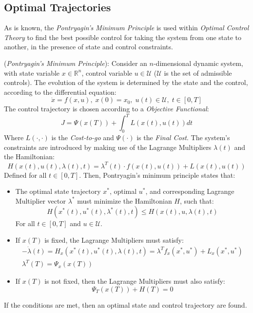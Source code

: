 \subsection{Optimal Trajectories}
As is known, the \textit{Pontryagin's Minimum Principle}  is used within \textit{Optimal Control Theory} to find the best possible control for taking the system from one state to another, in the presence of state and control constraints. 
\begin{definition}\label{Pontryagin_Min_Principle}
    (\textit{Pontryagin's Minimum Principle}): Consider an $n$-dimensional dynamic system, with state variable $x \in \mathbb{R}^{n}$, control variable $u\in\mathcal{U}$ ($\mathcal{U}$ is the set of admissible controls). The evolution of the system is determined by the state and the control, according to the differential equation:
    \begin{equation*}
        \dot{x}=f(x,u), \; x(0)=x_0, \; u(t)\in\mathcal{U}, \; t\in[0, T]
    \end{equation*}
    The control trajectory is chosen according to a \textit{Objective Functional}:
    \begin{equation*}
        J=\Psi(x(T))+\int_{0}^{T}{L(x(t),u(t))dt} 
    \end{equation*}
    Where $L(\cdot,\cdot)$ is the \textit{Cost-to-go} and $\Psi(\cdot)$ is the \textit{Final Cost}. The system's constraints are introduced by making use of the Lagrange Multipliers $\lambda(t)$ and the Hamiltonian:
    \begin{equation*}
        H(x(t),u(t),\lambda(t),t)=\lambda^{T}(t)\cdot f(x(t),u(t))+L(x(t),u(t))
    \end{equation*}                                    
    Defined for all $t\in[0,T]$. Then, Pontryagin's minimum principle states that:
    \begin{itemize}
        \item  The optimal state trajectory $x^*$, optimal $u^*$, and corresponding Lagrange Multiplier vector $\lambda^*$ must minimize the Hamiltonian $H$, such that:
        \begin{equation}\label{Hamiltonian_Minimization}
            H(x^*(t),u^*(t),\lambda^*(t),t)\leq H(x(t),u,\lambda(t),t)
        \end{equation}
        For all $t\in[0,T]$ and $u \in \mathcal{U}$. 
        \item If $x(T)$ is fixed, the Lagrange Multipliers must satisfy:
        \begin{gather}\label{fixed_state_lagrangian_mult}
            -\dot{\lambda}(t)=H_{x}(x^*(t),u^*(t),\lambda(t),t)=\lambda^{T}f_x(x^*,u^*)+L_{x}(x^*,u^*) \\
            \lambda^{T}(T)=\Psi_{x}(x(T))
        \end{gather}
        \item If $x(T)$ is not fixed, then the Lagrange Multipliers must also satisfy:
        \begin{equation}\label{not_fixed_state_lagrangian_mult}
            \Psi_{T}(x(T))+H(T)=0
        \end{equation}
    \end{itemize}
    If the conditions are met, then an optimal state and control trajectory are found.
\end{definition}
